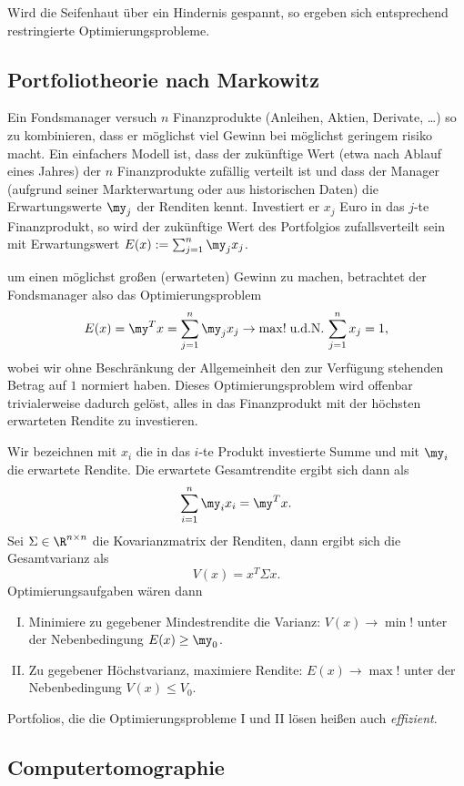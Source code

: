 Wird die Seifenhaut über ein Hindernis gespannt, so ergeben sich entsprechend restringierte Optimierungsprobleme.

\subsection{Portfoliotheorie nach Markowitz}

Ein Fondsmanager versuch $n$ Finanzprodukte (Anleihen, Aktien, Derivate, \dots) so zu kombinieren, dass er möglichst viel Gewinn bei möglichst geringem risiko macht.
Ein einfachers Modell ist, dass der zukünftige Wert (etwa nach Ablauf eines Jahres) der $n$ Finanzprodukte zufällig verteilt ist und dass der Manager (aufgrund seiner Markterwartung oder aus historischen Daten) die Erwartungswerte $\my_j$ der Renditen kennt.
Investiert er $x_j$ Euro in das $j$-te Finanzprodukt, so wird der zukünftige Wert des Portfolgios zufallsverteilt sein mit Erwartungswert $E(x) := \sum_{j=1}^n \my_j x_j$.

um einen möglichst großen (erwarteten) Gewinn zu machen, betrachtet der Fondsmanager also das Optimierungsproblem
\[
	E(x) = \my^Tx = \sum_{j=1}^n \my_j x_j \to \max!
	\udN
	\sum_{j=1}^n x_j = 1,
\]
wobei wir ohne Beschränkung der Allgemeinheit den zur Verfügung stehenden Betrag auf $1$ normiert haben.
Dieses Optimierungsproblem wird offenbar trivialerweise dadurch gelöst, alles in das Finanzprodukt mit der höchsten erwarteten Rendite zu investieren.


Wir bezeichnen mit $x_i$ die in das $i$-te Produkt investierte Summe und mit $\my_i$ die erwartete Rendite.
Die erwartete Gesamtrendite ergibt sich dann als
\[
	\sum_{i=1}^n \my_i x_i = \my^T x.
\]
Sei $\Sigma \in \R^{n\times n}$ die Kovarianzmatrix der Renditen, dann ergibt sich die Gesamtvarianz als
\[
	V(x) = x^T \Sigma x.
\]
Optimierungsaufgaben wären dann
\begin{enumerate}[I.]
	\item
		Minimiere zu gegebener Mindestrendite die Varianz:
		$V(x) \to \min!$ unter der Nebenbedingung $E(x) \ge \my_0$.
	\item
		Zu gegebener Höchstvarianz, maximiere Rendite:
		$E(x) \to \max!$ unter der Nebenbedingung $V(x) \le V_0$.
\end{enumerate}
Portfolios, die die Optimierungsprobleme I und II lösen heißen auch \emph{effizient}.

\subsection{Computertomographie}

